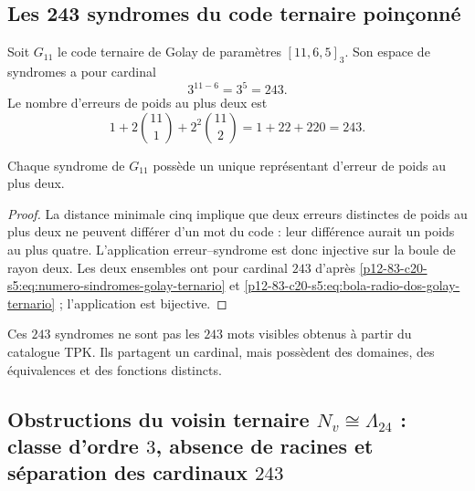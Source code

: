 \subsection{Les 243 syndromes du code ternaire poinçonné}

Soit \(G_{11}\) le code ternaire de Golay de paramètres
\([11,6,5]_3\). Son espace de syndromes a pour cardinal
\begin{equation}
 3^{11-6}=3^5=243.
 \label{p12-83-c20-s5:eq:numero-sindromes-golay-ternario}
\end{equation}
Le nombre d'erreurs de poids au plus deux est
\begin{equation}
 1+2\binom{11}{1}+2^2\binom{11}{2}
 =1+22+220=243.
 \label{p12-83-c20-s5:eq:bola-radio-dos-golay-ternario}
\end{equation}

\begin{proposition}
\label{p12-83-c20-s5:prop:correspondencia-error-sindrome-golay}
Chaque syndrome de \(G_{11}\) possède un unique représentant d'erreur de poids
au plus deux.
\end{proposition}

\begin{proof}
La distance minimale cinq implique que deux erreurs distinctes de poids au
plus deux ne peuvent différer d'un mot du code : leur différence aurait un
poids au plus quatre. L'application erreur--syndrome est donc
injective sur la boule de rayon deux. Les deux ensembles ont pour cardinal
\(243\) d'après \eqref{p12-83-c20-s5:eq:numero-sindromes-golay-ternario} et
\eqref{p12-83-c20-s5:eq:bola-radio-dos-golay-ternario} ; l'application est bijective.
\end{proof}

Ces \(243\) syndromes ne sont pas les \(243\) mots visibles obtenus à partir du
catalogue TPK. Ils partagent un cardinal, mais possèdent des domaines, des équivalences et
des fonctions distincts.

\subsection{Obstructions du voisin ternaire \(N_v\cong\Lambda_{24}\) : classe d'ordre \(3\), absence de racines et séparation des cardinaux \(243\)}


